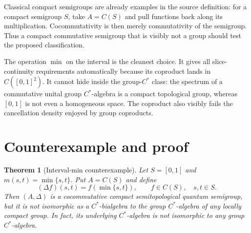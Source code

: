 \documentclass[11pt]{article}
\newtheorem{theorem}{Theorem}
\newcommand{\D}{\Delta}
\begin{document}
Classical compact semigroups are already examples in the source definition:
for a compact semigroup $S$, take $A=C(S)$ and pull functions back along its
multiplication.  Cocommutativity is then merely commutativity of the semigroup.
Thus a compact commutative semigroup that is visibly not a group should test
the proposed classification.

The operation $\min$ on the interval is the cleanest choice.  It gives all
slice-continuity requirements automatically because its coproduct lands in
$C([0,1]^2)$.  It cannot hide inside the group-$C^*$ class: the spectrum of a
commutative unital group $C^*$-algebra is a compact topological group, whereas
$[0,1]$ is not even a homogeneous space.  The coproduct also visibly fails the
cancellation density enjoyed by group coproducts.

\section{Counterexample and proof}

\begin{theorem}[Interval-min counterexample]\label{thm:main}
Let $S=[0,1]$ and $m(s,t)=\min\{s,t\}$.  Put $A=C(S)$ and define
\begin{equation}\label{eq:coproduct}
 (\D f)(s,t)=f(\min\{s,t\}),
 \qquad f\in C(S),\quad s,t\in S.
\end{equation}
Then $(A,\D)$ is a cocommutative compact semitopological quantum semigroup,
but it is not isomorphic as a $C^*$-bialgebra to the group $C^*$-algebra of
any locally compact group.  In fact, its underlying $C^*$-algebra is not
isomorphic to any group $C^*$-algebra.
\end{theorem}
\end{document}
